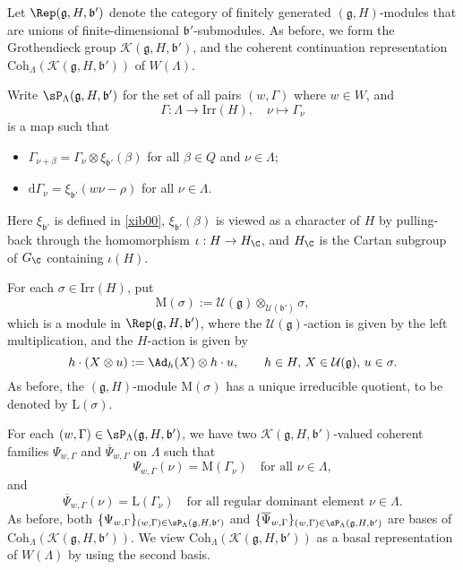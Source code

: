 \documentclass[12pt]{amsart}
\newcommand{\CK}{{\mathcal {K}}}
\newcommand{\CU}{{\mathcal {U}}}
\newcommand{\g}{\mathfrak g}
\renewcommand{\b}{\mathfrak b}
\numberwithin{equation}{section}
\theoremstyle{remark}
\def\Irr{\mathrm{Irr}}
\def\Coh{\mathrm{Coh}}
\begin{document}
Let $\Rep(\g,H,\b')$ denote the category of finitely generated $(\g, H)$-modules that  are unions of finite-dimensional $\b'$-submodules.
As before, we form the Grothendieck group  $\CK(\g,H, \b')$, and the coherent continuation representation $\Coh_{\Lambda}(\CK(\g,H, \b'))$ of $W(\Lambda)$.



Write $\sP_{\Lambda}(\g, H, \b')$ for the set of all pairs $(w, \Gamma)$ where $w\in W$, and
\[
\Gamma:   \Lambda\rightarrow \Irr(H), \quad \nu\mapsto \Gamma_\nu
\]
is a map
 such that
\begin{itemize}
  \item $\Gamma_{\nu+\beta}=\Gamma_\nu\otimes \xi_{\b'}(\beta)$ for all $\beta\in Q$ and $\nu\in \Lambda$;
  \item $\mathrm d  \Gamma_\nu= \xi_{\b'}(w\nu-\rho)$ for all $\nu\in  \Lambda$.
  \end{itemize}
Here  $\xi_{\b'}$ is defined in \cref{xib00},  $\xi_{\b'}(\beta)$ is viewed as a character of $H$ by  pulling-back through
the homomorphism $\iota: H\rightarrow H_\C$,
and $H_\C$ is the Cartan subgroup of $G_\C$ containing $\iota(H)$.

\def\olgamma{\overline\gamma}
\def\olPsi{\overline\Psi}
\def\olrX{\overline\rX}



For each $\sigma\in \Irr(H)$, put
\[
  \mathrm M(\sigma):=\CU(\g)\otimes_{\CU(\b')} \sigma,
\]
which is a module in $\Rep(\g,H,\b')$, where the $\CU(\g)$-action is given by the left multiplication, and the $H$-action is given by
\[
 h\cdot (X\otimes u):=\Ad_h(X)\otimes h \cdot u, \qquad h\in H, \, X\in \CU(\g),\, u\in \sigma.
\]
As before, the $(\g,H)$-module $\mathrm M(\sigma)$ has a unique irreducible quotient, to be denoted by $\mathrm L(\sigma)$.



For each $(w, \Gamma)\in\sP_{\Lambda}(\g,H,\b')$,  we  have two $\CK(\g,H,\b')$-valued coherent families  $\Psi_{w,\Gamma}$ and $\olPsi_{w, \Gamma}$ on $\Lambda$  such that
\begin{equation}\label{eq:psigamma}
  \Psi_{w,\Gamma}(\nu)=\mathrm M(\Gamma_\nu) \quad\textrm{for all $\nu\in \Lambda$},
  \end{equation}
  and
  \begin{equation}
  \olPsi_{w,\Gamma}(\nu)=\mathrm L(\Gamma_\nu) \quad\textrm{for all regular dominant element $\nu\in \Lambda$}.
\end{equation}
As before, both
$\{ \Psi_{w,\Gamma}\}_{(w,\Gamma)\in\sP_{\Lambda}(\g,H,\b')}$ and $\{ \olPsi_{w,\Gamma}\}_{(w,\Gamma)\in\sP_{\Lambda}(\g,H,\b')}$ are bases of $\Coh_{\Lambda}(\CK(\g,H, \b'))$. We view $\Coh_{\Lambda}(\CK(\g,H, \b'))$ as a basal representation of $W(\Lambda)$ by using the second basis.
\end{document}
